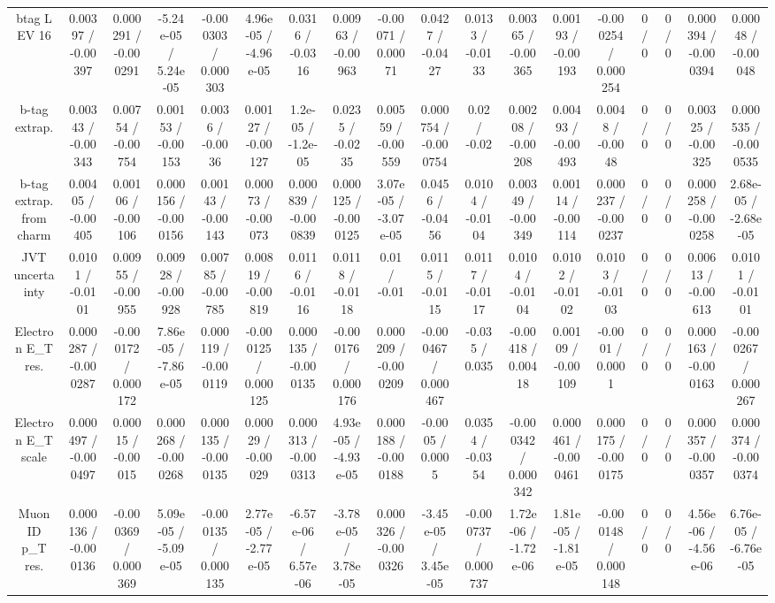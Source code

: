 \documentclass[10pt]{article}
\begin{document}
\begin{table}[htbp]
\begin{center}
\begin{tabular}{|c|c|c|c|c|c|c|c|c|c|c|c|c|c|c|c|c|c|}
  btag L EV 16 & 0.00397 / -0.00397 & 0.000291 / -0.000291 & -5.24e-05 / 5.24e-05 & -0.000303 / 0.000303 & 4.96e-05 / -4.96e-05 & 0.0316 / -0.0316 & 0.00963 / -0.00963 & -0.00071 / 0.00071 & 0.0427 / -0.0427 & 0.0133 / -0.0133 & 0.00365 / -0.00365 & 0.00193 / -0.00193 & -0.000254 / 0.000254 & 0 / 0 & 0 / 0 & 0.000394 / -0.000394 & 0.00048 / -0.00048 \\ 
  b-tag extrap. & 0.00343 / -0.00343 & 0.00754 / -0.00754 & 0.00153 / -0.00153 & 0.0036 / -0.0036 & 0.00127 / -0.00127 & 1.2e-05 / -1.2e-05 & 0.0235 / -0.0235 & 0.00559 / -0.00559 & 0.000754 / -0.000754 & 0.02 / -0.02 & 0.00208 / -0.00208 & 0.00493 / -0.00493 & 0.0048 / -0.0048 & 0 / 0 & 0 / 0 & 0.00325 / -0.00325 & 0.000535 / -0.000535 \\ 
  b-tag extrap. from charm & 0.00405 / -0.00405 & 0.00106 / -0.00106 & 0.000156 / -0.000156 & 0.00143 / -0.00143 & 0.00073 / -0.00073 & 0.000839 / -0.000839 & 0.000125 / -0.000125 & 3.07e-05 / -3.07e-05 & 0.0456 / -0.0456 & 0.0104 / -0.0104 & 0.00349 / -0.00349 & 0.00114 / -0.00114 & 0.000237 / -0.000237 & 0 / 0 & 0 / 0 & 0.000258 / -0.000258 & 2.68e-05 / -2.68e-05 \\ 
  JVT uncertainty & 0.0101 / -0.0101 & 0.00955 / -0.00955 & 0.00928 / -0.00928 & 0.00785 / -0.00785 & 0.00819 / -0.00819 & 0.0116 / -0.0116 & 0.0118 / -0.0118 & 0.01 / -0.01 & 0.0115 / -0.0115 & 0.0117 / -0.0117 & 0.0104 / -0.0104 & 0.0102 / -0.0102 & 0.0103 / -0.0103 & 0 / 0 & 0 / 0 & 0.00613 / -0.00613 & 0.0101 / -0.0101 \\ 
  Electron E_{T} res. & 0.000287 / -0.000287 & -0.000172 / 0.000172 & 7.86e-05 / -7.86e-05 & 0.000119 / -0.000119 & -0.000125 / 0.000125 & 0.000135 / -0.000135 & -0.000176 / 0.000176 & 0.000209 / -0.000209 & -0.000467 / 0.000467 & -0.035 / 0.035 & -0.00418 / 0.00418 & 0.00109 / -0.00109 & -0.0001 / 0.0001 & 0 / 0 & 0 / 0 & 0.000163 / -0.000163 & -0.000267 / 0.000267 \\ 
  Electron E_{T} scale & 0.000497 / -0.000497 & 0.00015 / -0.00015 & 0.000268 / -0.000268 & 0.000135 / -0.000135 & 0.00029 / -0.00029 & 0.000313 / -0.000313 & 4.93e-05 / -4.93e-05 & 0.000188 / -0.000188 & -0.0005 / 0.0005 & 0.0354 / -0.0354 & -0.000342 / 0.000342 & 0.000461 / -0.000461 & 0.000175 / -0.000175 & 0 / 0 & 0 / 0 & 0.000357 / -0.000357 & 0.000374 / -0.000374 \\ 
  Muon ID p_{T} res. & 0.000136 / -0.000136 & -0.000369 / 0.000369 & 5.09e-05 / -5.09e-05 & -0.000135 / 0.000135 & 2.77e-05 / -2.77e-05 & -6.57e-06 / 6.57e-06 & -3.78e-05 / 3.78e-05 & 0.000326 / -0.000326 & -3.45e-05 / 3.45e-05 & -0.000737 / 0.000737 & 1.72e-06 / -1.72e-06 & 1.81e-05 / -1.81e-05 & -0.000148 / 0.000148 & 0 / 0 & 0 / 0 & 4.56e-06 / -4.56e-06 & 6.76e-05 / -6.76e-05 \\ 

\end{tabular}
\end{center}
\end{table}
\end{document}
